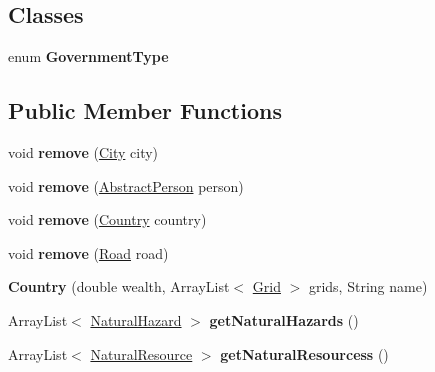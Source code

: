 \subsection*{Classes}
\begin{DoxyCompactItemize}
\item 
enum {\bfseries Government\+Type}
\end{DoxyCompactItemize}
\subsection*{Public Member Functions}
\begin{DoxyCompactItemize}
\item 
void {\bfseries remove} (\hyperlink{classcities_1_1_city}{City} city)\hypertarget{classplanets_1_1_country_ae868a031eecd5008bebf65e60aa4b2ce}{}\label{classplanets_1_1_country_ae868a031eecd5008bebf65e60aa4b2ce}

\item 
void {\bfseries remove} (\hyperlink{classpeople_1_1_abstract_person}{Abstract\+Person} person)\hypertarget{classplanets_1_1_country_af01e3161fed98cdd7e9bcb34615992d0}{}\label{classplanets_1_1_country_af01e3161fed98cdd7e9bcb34615992d0}

\item 
void {\bfseries remove} (\hyperlink{classplanets_1_1_country}{Country} country)\hypertarget{classplanets_1_1_country_a1a9e464d596f4cf8ffd431eef1dcb9ca}{}\label{classplanets_1_1_country_a1a9e464d596f4cf8ffd431eef1dcb9ca}

\item 
void {\bfseries remove} (\hyperlink{classplanets_1_1_road}{Road} road)\hypertarget{classplanets_1_1_country_a1f82936f23ce4518f8ae6cb9e160489e}{}\label{classplanets_1_1_country_a1f82936f23ce4518f8ae6cb9e160489e}

\item 
{\bfseries Country} (double wealth, Array\+List$<$ \hyperlink{classplanets_1_1_grid}{Grid} $>$ grids, String name)\hypertarget{classplanets_1_1_country_ad9f65b6dee7a486eec06d79382dccb49}{}\label{classplanets_1_1_country_ad9f65b6dee7a486eec06d79382dccb49}

\item 
Array\+List$<$ \hyperlink{classplanets_1_1_natural_hazard}{Natural\+Hazard} $>$ {\bfseries get\+Natural\+Hazards} ()\hypertarget{classplanets_1_1_country_a9d28f42cada09de8822a7eb1bbf62ce8}{}\label{classplanets_1_1_country_a9d28f42cada09de8822a7eb1bbf62ce8}

\item 
Array\+List$<$ \hyperlink{classplanets_1_1_natural_resource}{Natural\+Resource} $>$ {\bfseries get\+Natural\+Resourcess} ()\hypertarget{classplanets_1_1_country_abb470e2d08285fac1dcac67e2d890bb3}{}\label{classplanets_1_1_country_abb470e2d08285fac1dcac67e2d890bb3}


\end{DoxyCompactItemize}
